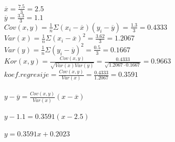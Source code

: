 \documentclass{article}%
\begin{document}
%
\normalsize%
\renewcommand{\arraystretch}{2}%
\\%
\\[1em]%
\Large $\overline{x}=\frac{7.5}{3}=2.5$%
\\[1em]%
\Large $\overline{y}=\frac{3.3}{3}=1.1$%
\\[1em]%
\Large $Cov(x,y)=\frac{1}{n}\Sigma(x_i-\overline{x})(y_i-\overline{y})=\frac{1.3}{3}=0.4333$%
\\[1em]%
\Large $Var(x)=\frac{1}{n}\Sigma{(x_i-\overline{x})}^2=\frac{3.62}{3}=1.2067$%
\\[1em]%
\Large $Var(y)=\frac{1}{n}\Sigma{(y_i-\overline{y})}^2=\frac{0.5}{3}=0.1667$%
\\[1em]%
\Large $Kor(x,y)=\frac{Cov(x,y)}{\sqrt{Var(x)Var(y)}}=\frac{0.4333}{\sqrt{1.2067 \cdot 0.1667}}=0.9663$%
\\[1em]%
\Large $koef. regresije=\frac{Cov(x,y)}{Var(x)}=\frac{0.4333}{1.2067}=0.3591$%
\\[1em]%
\Large {}\\%
$y-\overline{y}=\frac{Cov(x,y)}{Var(x)}(x-\overline{x})$\\%
\\[1em]%
$y-1.1=0.3591(x-2.5)$\\%
\\[1em]%
$y=0.3591x+0.2023$%
\end{document}
